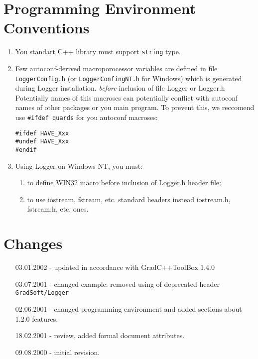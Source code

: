 \documentclass[10pt]{article}
\begin{document}
\section{ Programming Environment Conventions }

\begin{enumerate}
  \item You standart C++ library must support \verb|string| type.
  \item Few autoconf-derived macroporocessor variables are defined in file 
  \verb|LoggerConfig.h| (or \verb|LoggerConfingNT.h| for Windows)
 which is generated during Logger installation. 
  {\em before} inclusion of file Logger or Logger.h
  Potentially names of this macroses can potentially conflict with autoconf names  of other packages or you main program.
  To prevent this, we reccomend use \verb|#ifdef quards| for you autoconf macroses:
\begin{verbatim}
#ifdef HAVE_Xxx  
#undef HAVE_Xxx  
#endif
\end{verbatim}
  \item Using Logger on Windows NT, you must:
    \begin{enumerate}
      \item to define WIN32 macro before inclusion of Logger.h header file;
      \item to use iostream, fstream, etc. standard headers instead iostream.h, fstream.h, etc. ones.
    \end{enumerate}
\end{enumerate}

\section{ Changes }

\begin{itemize}
 \item [03.01.2002] - updated in accordance with GradC++ToolBox 1.4.0
 \item [03.07.2001] - changed example: removed using of deprecated header 
   \verb|GradSoft/Logger|
 \item [02.06.2001] - changed programming environment and added 
 sections about 1.2.0 features.
 \item [18.02.2001] - review, added formal document attributes.
 \item [09.08.2000] - initial revision.
\end{itemize}
\end{document}
